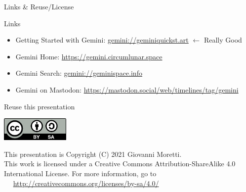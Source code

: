 \documentclass[presentation, 11pt,  aspectratio=169]{beamer}
\begin{document}
\begin{frame}[label={sec:org9cfb259}]{Links \& Reuse/License}
\begin{block}{Links}
\begin{itemize}
\item \alert{Getting Started with Gemini:} \href{gemini://geminiquickst.art}{gemini://geminiquickst.art} \(\leftarrow\) \alert{Really Good}\\
\item \alert{Gemini Home:} \url{https://gemini.circumlunar.space}\\
\item \alert{Gemini Search:} \href{gemini://geminispace.info}{gemini://geminispace.info}\\
\item \alert{Gemini on Mastodon:} \url{https://mastodon.social/web/timelines/tag/gemini}\\
\end{itemize}
\end{block}

\begin{block}{Reuse this presentation}
\begin{center}
\includegraphics[width=0.25\textwidth]{images-external/cc-by-sa.png}
\end{center}

\begin{small}
This presentation is Copyright (C) 2021 Giovanni Moretti.\\

This work is licensed under a Creative Commons Attribution-ShareAlike 4.0 International License. For more information, go to\\
~~ \url{http://creativecommons.org/licenses/by-sa/4.0/}\\
\end{small}
\end{block}
\end{frame}
\end{document}

